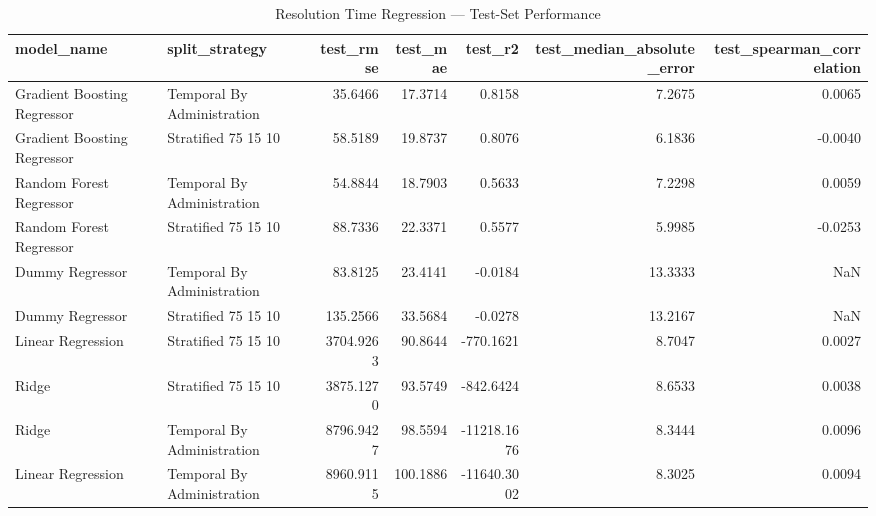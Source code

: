 \begin{table}
\caption{Resolution Time Regression — Test-Set Performance}
\label{tab:resolution_time_results}
\begin{tabular}{llrrrrr}
\toprule
model_name & split_strategy & test_rmse & test_mae & test_r2 & test_median_absolute_error & test_spearman_correlation \\
\midrule
Gradient Boosting Regressor & Temporal By Administration & 35.6466 & 17.3714 & 0.8158 & 7.2675 & 0.0065 \\
Gradient Boosting Regressor & Stratified 75 15 10 & 58.5189 & 19.8737 & 0.8076 & 6.1836 & -0.0040 \\
Random Forest Regressor & Temporal By Administration & 54.8844 & 18.7903 & 0.5633 & 7.2298 & 0.0059 \\
Random Forest Regressor & Stratified 75 15 10 & 88.7336 & 22.3371 & 0.5577 & 5.9985 & -0.0253 \\
Dummy Regressor & Temporal By Administration & 83.8125 & 23.4141 & -0.0184 & 13.3333 & NaN \\
Dummy Regressor & Stratified 75 15 10 & 135.2566 & 33.5684 & -0.0278 & 13.2167 & NaN \\
Linear Regression & Stratified 75 15 10 & 3704.9263 & 90.8644 & -770.1621 & 8.7047 & 0.0027 \\
Ridge & Stratified 75 15 10 & 3875.1270 & 93.5749 & -842.6424 & 8.6533 & 0.0038 \\
Ridge & Temporal By Administration & 8796.9427 & 98.5594 & -11218.1676 & 8.3444 & 0.0096 \\
Linear Regression & Temporal By Administration & 8960.9115 & 100.1886 & -11640.3002 & 8.3025 & 0.0094 \\
\bottomrule
\end{tabular}
\end{table}
